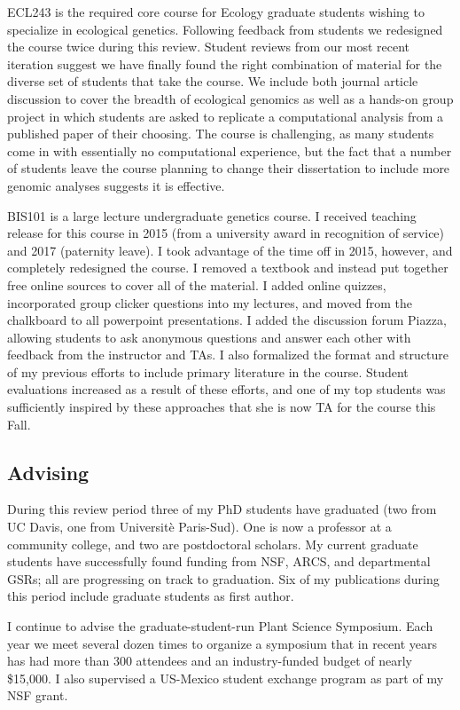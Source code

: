 \documentclass[letterpaper,10pt]{article}
\begin{document}
ECL243 is the required core course for Ecology graduate students wishing to specialize in ecological genetics.
Following feedback from students we redesigned the course twice during this review.
Student reviews from our most recent iteration suggest we have finally found the right combination of material for the diverse set of students that take the course.
We include both journal article discussion to cover the breadth of ecological genomics as well as a hands-on group project in which students are asked to replicate a computational analysis from a published paper of their choosing.
The course is challenging, as many students come in with essentially no computational experience, but the fact that a number of students leave the course planning to change their dissertation to include more genomic analyses suggests it is effective.

BIS101 is a large lecture undergraduate genetics course. I received teaching release for this course in 2015 (from a university award in recognition of service) and 2017 (paternity leave).
I took advantage of the time off in 2015, however, and completely redesigned the course.
I removed a textbook and instead put together free online sources to cover all of the material.
I added online quizzes, incorporated group clicker questions into my lectures, and moved from the chalkboard to all powerpoint presentations.
I added the discussion forum Piazza, allowing students to ask anonymous questions and answer each other with feedback from the instructor and TAs.
I also formalized the format and structure of my previous efforts to include primary literature in the course.
Student evaluations increased as a result of these efforts, and one of my top students was sufficiently inspired by these approaches that she is now TA for the course this Fall.

\subsection*{Advising}
During this review period three of my PhD students have graduated (two from UC Davis, one from Universit\`{e} Paris-Sud).
One is now a professor at a community college, and two are postdoctoral scholars.
My current graduate students have successfully found funding from NSF, ARCS, and departmental GSRs; all are progressing on track to graduation.
Six of my publications during this period include graduate students as first author.

I continue to advise the graduate-student-run Plant Science Symposium.
Each year we meet several dozen times to organize a symposium that in recent years has had more than 300 attendees and an industry-funded budget of nearly \$15,000.
I also supervised a US-Mexico student exchange program as part of my NSF grant.
\end{document}
